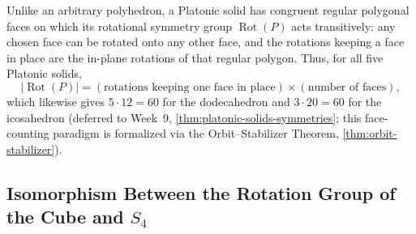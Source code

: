 \begin{content}

\begin{steps}
Unlike an arbitrary polyhedron, a Platonic solid has congruent regular polygonal faces on which its rotational symmetry group $\operatorname{Rot}(P)$ acts transitively: any chosen face can be rotated onto any other face, and the rotations keeping a face in place are the in-plane rotations of that regular polygon. Thus, for all five Platonic solids,
\[
|\operatorname{Rot}(P)| = (\text{rotations keeping one face in place}) \times (\text{number of faces}),
\]
which likewise gives $5 \cdot 12 = 60$ for the dodecahedron and $3 \cdot 20 = 60$ for the icosahedron (deferred to Week~9, \cref{thm:platonic-solids-symmetries}; this face-counting paradigm is formalized via the Orbit--Stabilizer Theorem, \cref{thm:orbit-stabilizer}).
\end{steps}
\end{content}

\begin{hidden}
\end{hidden}

\subsection{Isomorphism Between the Rotation Group of the Cube and \texorpdfstring{$S_4$}{S4}}

